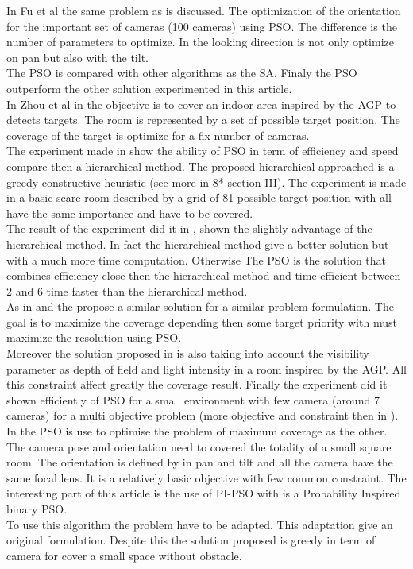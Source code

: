In Fu et al \cite{194*fu2010} the same problem as \cite{84*xu2011} is discussed. The optimization of the orientation for the important set of cameras (100 cameras) using PSO. The difference is the number of parameters to optimize. In \cite{194*fu2010} the looking direction is not only optimize on pan but also with the tilt.  \\
The PSO is compared with other algorithms as the SA. Finaly the PSO outperform the other solution experimented in this article.\\

In Zhou et al in \cite{8*zhou2011} the objective is to cover an indoor area inspired by the AGP to detects targets. The room is represented by a set of possible target position. The coverage of the target is optimize for a fix number of cameras. \\
 The experiment made in \cite{8*zhou2011} show the ability of PSO in term of efficiency and speed compare then a hierarchical method. The proposed hierarchical approached is a greedy constructive heuristic (see more in 8* section III). The experiment is made in a basic scare room described by a grid of 81 possible target position with all have the same importance and have to be covered. \\
The result of the experiment did it in \cite{8*zhou2011}, shown the slightly advantage of the hierarchical method. In fact the hierarchical method give a better solution but with a much more time computation. Otherwise The PSO is the solution that combines efficiency close then the hierarchical method and time efficient between 2 and 6 time faster than the hierarchical method. \\

As in \cite{8*zhou2011} and the \cite{33*reddy2012}  propose a similar solution for a similar problem formulation. The goal is to maximize the coverage depending then some target priority with must maximize the resolution using PSO.\\
Moreover the solution proposed in \cite{33*reddy2012} is also taking into account the visibility parameter as depth of field and light intensity in a room inspired by the AGP. All this constraint affect greatly the coverage result. Finally the experiment did it  shown efficiently of PSO for a small environment with few camera (around 7 cameras) for a multi objective problem (more objective and constraint then in \cite{8*zhou2011}). \\

In \cite{193*fu2014} the PSO  is use to optimise the problem of maximum coverage as the other. 
 The camera pose and orientation need to covered the totality of a small square room.
 The orientation is defined by in pan and tilt and all the camera have the same focal lens. It is a relatively basic objective with few  common constraint. 
 The interesting part of this article is the use of PI-PSO with is a Probability Inspired binary PSO. \\
 To use this algorithm the problem have to be adapted. This adaptation give an original formulation. Despite this the solution proposed is greedy in term of camera for cover a small space without obstacle.\\
 

